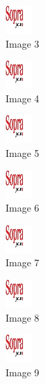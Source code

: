 \begin{figure}[!h]
  \center
  \includegraphics[width=1cm]{img/test.jpg}
  \caption{Image 3}
\end{figure}

\begin{figure}[!h]
  \center
  \includegraphics[width=1cm]{img/test.jpg}
  \caption{Image 4}
\end{figure}

\begin{figure}[!h]
  \center
  \includegraphics[width=1cm]{img/test.jpg}
  \caption{Image 5}
\end{figure}

\begin{figure}[!h]
  \center
  \includegraphics[width=1cm]{img/test.jpg}
  \caption{Image 6}
\end{figure}

\begin{figure}[!h]
  \center
  \includegraphics[width=1cm]{img/test.jpg}
  \caption{Image 7}
\end{figure}

\begin{figure}[!h]
  \center
  \includegraphics[width=1cm]{img/test.jpg}
  \caption{Image 8}
\end{figure}

\begin{figure}[!h]
  \center
  \includegraphics[width=1cm]{img/test.jpg}
  \caption{Image 9}
\end{figure}


